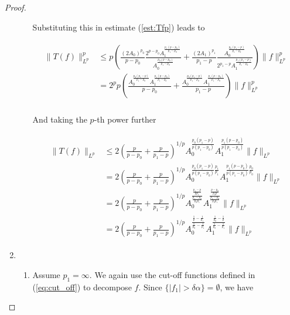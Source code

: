 \begin{proof}
\begin{enumerate}[label = \textbf{(\roman*.)}]
\begin{enumerate}[label = \textbf{\alph*.}]
		Substituting this in estimate (\ref{est:Tfp}) leads to

		\begin{gather}
			\begin{aligned}
				\|T(f)\|_{L^p}^p &\leqslant p\left( \frac{(2A_0)^{p_0}}{p - p_0}\frac{2^{p - p_0}A_1^\frac{p_1(p-p_0)}{p_1-p_0}}{A_0^\frac{p_0(p-p_0)}{p_1 - p_0}} + \frac{(2A_1)^{p_1}}{p_1 - p} \frac{A_0^\frac{p_0(p_1 - p)}{p_1 - p_0}}{2^{p_1 - p}A_1^\frac{p_1(p_1 - p)}{p_1 - p_0}} \right)\|f\|_{L^p}^p\\
				&=  2^pp\left( \frac{A_0^\frac{p_0(p_1 - p)}{p_1 - p_0}A_1^\frac{p_1(p-p_0)}{p_1-p_0}}{p - p_0} + \frac{A_0^\frac{p_0(p_1 - p)}{p_1 - p_0}A_1^\frac{p_1(p - p_0)}{p_1 - p_0}}{p_1- p} \right)\|f\|_{L^p}^p\\
			\end{aligned}
		\end{gather}

		And taking the $p$-th power further

		\begin{gather}
			\begin{aligned}
				\|T(f)\|_{L^p} &\leqslant 2\left( \frac{p}{p - p_0} + \frac{p}{p_1- p} \right)^{1/p} A_0^\frac{p_0(p_1 - p)}{p(p_1 - p_0)}A_1^\frac{p_1(p - p_0)}{p(p_1 - p_0)}\|f\|_{L^p}\\
				&= 2\left( \frac{p}{p - p_0} + \frac{p}{p_1- p} \right)^{1/p} A_0^{\frac{p_0(p_1 - p)}{p(p_1 - p_0)}\frac{p_1}{p_1}}A_1^{\frac{p_1(p - p_0)}{p(p_1 - p_0)}\frac{p_0}{p_0}}\|f\|_{L^p}\\
				&= 2\left( \frac{p}{p - p_0} + \frac{p}{p_1- p} \right)^{1/p} A_0^{\frac{\frac{p_1 - p}{pp_1}}{\frac{p_1 - p_0}{p_0p_1}}}A_1^{\frac{\frac{p - p_0}{p_0p}}{\frac{p_1 - p_0}{p_0p_1}}}\|f\|_{L^p}\\
				&= 2\left( \frac{p}{p - p_0} + \frac{p}{p_1- p} \right)^{1/p} A_0^{\frac{\frac{1}{p} - \frac{1}{p_1}}{\frac{1}{p_0} - \frac{1}{p_1}}}A_1^{\frac{\frac{1}{p_0} - \frac{1}{p}}{\frac{1}{p_0} - \frac{1}{p_1}}}\|f\|_{L^p}
			\end{aligned}
		\end{gather}
	\end{enumerate}
	
\item
	\begin{enumerate}[label = \textbf{\alph*.}]
		\item Assume \underline{$p_1 = \infty$}. We again use the cut-off functions defined in (\ref{eq:cut_off}) to decompose $f$.  Since $\{\vert f_1\vert > \delta\alpha \} = \emptyset$, we have 


\end{enumerate}
\end{enumerate}
\end{proof}
